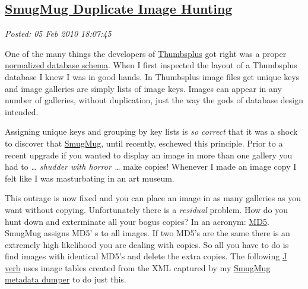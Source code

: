 %

\subsection*{\href{https://bakerjd99.wordpress.com/2010/02/05/smugmug-duplicate-image-hunting/}{SmugMug Duplicate Image Hunting}}


\noindent\emph{Posted: 05 Feb 2010 18:07:45}
\vspace{6pt}

One of the many things the developers of
\href{http://www.cerious.com/}{Thumbsplus} got right was a proper
\href{http://en.wikipedia.org/wiki/Database\_normalization}{normalized
database schema}. When I first inspected the layout of a Thumbsplus
database I knew I was in good hands. In Thumbsplus image files get
unique keys and image galleries are simply lists of image keys. Images
can appear in any number of galleries, without duplication, just the way
the gods of database design intended.

Assigning unique keys and grouping by key lists is \emph{so correct}
that it was a shock to discover that
\href{http://www.smugmug.com/}{SmugMug}, until recently, eschewed this
principle. Prior to a recent upgrade if you wanted to display an image
in more than one gallery you had to \emph{\ldots{} shudder with horror
\ldots{}} make copies! Whenever I made an image copy I felt like I was
masturbating in an art museum.

This outrage is now fixed and you can place an image in as many
galleries as you want without copying. Unfortunately there is a
\emph{residual} problem. How do you hunt down and exterminate all your
bogus copies? In an acronym:
\href{http://www.fastsum.com/support/md5-checksum-utility-faq/md5-hash.php}{MD5}.
SmugMug assigns MD5' s to all images. If two MD5's are the same there is
an extremely high likelihood you are dealing with copies. So all you
have to do is find images with identical MD5's and delete the extra
copies. The following \href{http://www.jsoftware.com/}{J verb} uses image
tables created from the XML captured by my
\href{http://bakerjd99.wordpress.com/2010/02/03/command-line-c-smugmug-api-metadata-download/}{SmugMug
metadata dumper} to do just this.

